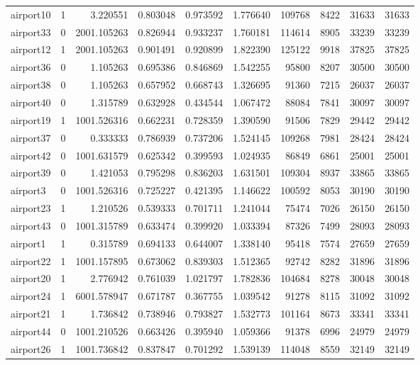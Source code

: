 \documentclass[../../../thesis.tex]{subfiles}
\begin{document}
\begin{longtable}{|l|r|r|r|r|r|r|r|r|r|}
airport10 & 1 & 3.220551 & 0.803048 & 0.973592 & 1.776640 & 109768 & 8422 & 31633 & 31633 \\
airport33 & 0 & 2001.105263 & 0.826944 & 0.933237 & 1.760181 & 114614 & 8905 & 33239 & 33239 \\
airport12 & 1 & 2001.105263 & 0.901491 & 0.920899 & 1.822390 & 125122 & 9918 & 37825 & 37825 \\
airport36 & 0 & 1.105263 & 0.695386 & 0.846869 & 1.542255 & 95800 & 8207 & 30500 & 30500 \\
airport38 & 0 & 1.105263 & 0.657952 & 0.668743 & 1.326695 & 91360 & 7215 & 26037 & 26037 \\
airport40 & 0 & 1.315789 & 0.632928 & 0.434544 & 1.067472 & 88084 & 7841 & 30097 & 30097 \\
airport19 & 1 & 1001.526316 & 0.662231 & 0.728359 & 1.390590 & 91506 & 7829 & 29442 & 29442 \\
airport37 & 0 & 0.333333 & 0.786939 & 0.737206 & 1.524145 & 109268 & 7981 & 28424 & 28424 \\
airport42 & 0 & 1001.631579 & 0.625342 & 0.399593 & 1.024935 & 86849 & 6861 & 25001 & 25001 \\
airport39 & 0 & 1.421053 & 0.795298 & 0.836203 & 1.631501 & 109304 & 8937 & 33865 & 33865 \\
airport3 & 0 & 1001.526316 & 0.725227 & 0.421395 & 1.146622 & 100592 & 8053 & 30190 & 30190 \\
airport23 & 1 & 1.210526 & 0.539333 & 0.701711 & 1.241044 & 75474 & 7026 & 26150 & 26150 \\
airport43 & 0 & 1001.315789 & 0.633474 & 0.399920 & 1.033394 & 87326 & 7499 & 28093 & 28093 \\
airport1 & 1 & 0.315789 & 0.694133 & 0.644007 & 1.338140 & 95418 & 7574 & 27659 & 27659 \\
airport22 & 1 & 1001.157895 & 0.673062 & 0.839303 & 1.512365 & 92742 & 8282 & 31896 & 31896 \\
airport20 & 1 & 2.776942 & 0.761039 & 1.021797 & 1.782836 & 104684 & 8278 & 30048 & 30048 \\
airport24 & 1 & 6001.578947 & 0.671787 & 0.367755 & 1.039542 & 91278 & 8115 & 31092 & 31092 \\
airport21 & 1 & 1.736842 & 0.738946 & 0.793827 & 1.532773 & 101164 & 8673 & 33341 & 33341 \\
airport44 & 0 & 1001.210526 & 0.663426 & 0.395940 & 1.059366 & 91378 & 6996 & 24979 & 24979 \\
airport26 & 1 & 1001.736842 & 0.837847 & 0.701292 & 1.539139 & 114048 & 8559 & 32149 & 32149 \\

\end{longtable}
\end{document}

